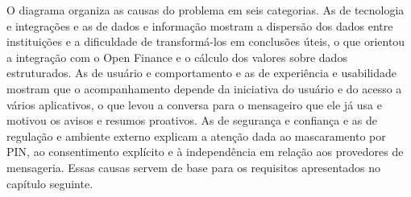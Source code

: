 O diagrama organiza as causas do problema em seis categorias. As de tecnologia e integrações e as de dados e informação mostram a dispersão dos dados entre instituições e a dificuldade de transformá-los em conclusões úteis, o que orientou a integração com o Open Finance e o cálculo dos valores sobre dados estruturados. As de usuário e comportamento e as de experiência e usabilidade mostram que o acompanhamento depende da iniciativa do usuário e do acesso a vários aplicativos, o que levou a conversa para o mensageiro que ele já usa e motivou os avisos e resumos proativos. As de segurança e confiança e as de regulação e ambiente externo explicam a atenção dada ao mascaramento por PIN, ao consentimento explícito e à independência em relação aos provedores de mensageria. Essas causas servem de base para os requisitos apresentados no capítulo seguinte.
